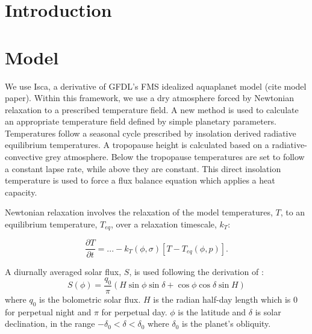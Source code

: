 \documentclass{ametsoc}
\begin{document}




\section{Introduction}






\section{Model}

We use Isca, a derivative of GFDL's FMS idealized aquaplanet model (cite model paper). Within this framework, we use a dry atmosphere forced by Newtonian relaxation to a prescribed temperature field. A new method is used to calculate an appropriate temperature field defined by simple planetary parameters. Temperatures follow a seasonal cycle prescribed by insolation derived radiative equilibrium temperatures. A tropopause height is calculated based on a radiative-convective grey atmosphere. Below the tropopause temperatures are set to follow a constant lapse rate, while above they are constant. This direct insolation temperature is used to force a flux balance equation which applies a heat capacity. 

Newtonian relaxation involves the relaxation of the model temperatures, $T$, to an equilibrium temperature, $T_{eq}$, over a relaxation timescale, $k_T$:

\begin{equation}
\label{eq:hs0}
\frac{\partial T}{\partial t} = ... -k_T(\phi,\sigma)\left[T - T_{eq}(\phi,p) \right].
\end{equation}


A diurnally averaged solar flux, $S$, is used following the derivation of \cite{Williams1997}:
\begin{equation}
\label{eq:diurnal_flux}
S(\phi) = \frac{q_0}{\pi}(H \sin\phi \sin\delta + \cos\phi \cos\delta \sin H)
\end{equation}
where $q_0$ is the bolometric solar flux. $H$ is the radian half-day length which is $0$ for perpetual night and $\pi$ for perpetual day. $\phi$ is the latitude and $\delta$ is solar declination, in the range $-\delta_0 < \delta < \delta_0$ where $\delta_0$ is the planet's obliquity.
\end{document}
